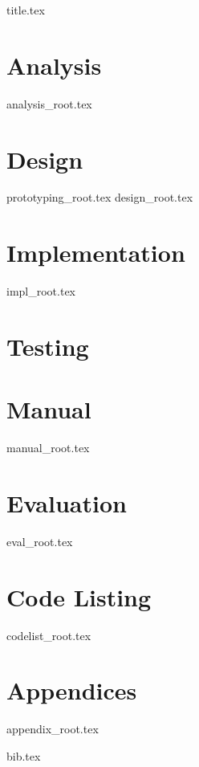 \documentclass[a4paper, 12pt]{scrartcl}
\begin{document}
{title.tex}

\begin{footnotesize}
\tableofcontents
\end{footnotesize}

\pagebreak

\section{Analysis}
{analysis_root.tex}
\pagebreak

\section{Design}
{prototyping_root.tex}
{design_root.tex}
\pagebreak

\section{Implementation}
{impl_root.tex}
\pagebreak

\section{Testing}
\pagebreak

\section{Manual}
{manual_root.tex}
\pagebreak

\section{Evaluation}
{eval_root.tex}
\pagebreak

\section{Code Listing}
{codelist_root.tex}
\pagebreak

\appendix
\section*{Appendices}
\renewcommand{\thesubsection}{\Alph{subsection}}
{appendix_root.tex}
\pagebreak

{bib.tex}
\end{document}
